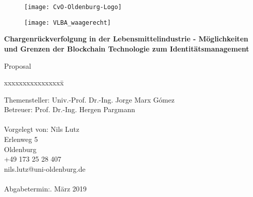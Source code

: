 \begin{titlepage}
  \begin{centering}
  \begin{figure}[h!]
    \centering
    \texttt{[image: CvO-Oldenburg-Logo]}    %
  \end{figure}

  \vspace*{-0.8cm}

  \begin{figure}[h!]
    \centering
    \texttt{[image: VLBA\_waagerecht]}    %
  \end{figure}

  \vspace*{0.4cm}

  \textsf{\Huge \textbf{Chargenrückverfolgung in der Lebensmittelindustrie - Möglichkeiten und Grenzen der Blockchain Technologie zum Identitätsmanagement\\}}

  \vspace*{0.5cm}
  \noindent Proposal\\

  \end{centering}

  \vspace*{1.5cm}
  \begin{tabbing}
  xxxxxxxxxxxxxxxx\= \kill

  \small Themensteller:\> Univ.-Prof. Dr.-Ing. Jorge Marx Gómez\\
  \small Betreuer:\> Prof. Dr.-Ing. Hergen Pargmann\\\\

  \small Vorgelegt von: \>Nils Lutz\\
  \small \>Erlenweg 5\\
  \small {} Oldenburg\\
  \small \>+49 173 25 28 407\\
  \small \>nils.lutz@uni-oldenburg.de\\\\

  \small Abgabetermin:. März 2019
  \end{tabbing}
\end{titlepage}
\newpage

